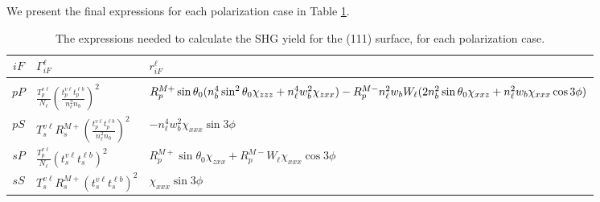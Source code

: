 \documentclass{article}
\begin{document}
We present the final expressions for each polarization case in Table
\ref{tab:summary}.

\begin{table}[b]
\centering
\begin{tabular}{ | c | p{80pt} | p{210pt} | }
\hline
$iF$ & $\Gamma^{\ell}_{iF}$ & $r^{\ell}_{iF}$ \\
\hline
&&\\
$pP$ &
$\frac{T^{v\ell}_{p}}{N_{\ell}}
\left(\frac{t^{v\ell}_{p}t^{\ell b}_{p}}{n^{2}_{\ell}n_{b}}\right)^{2}$ &
{\small
$R^{M+}_{p}\sin\theta_{0}
(n^{4}_{b}\sin^{2}\theta_{0}\chi_{zzz} + n^{4}_{\ell}w^{2}_{b}\chi_{zxx})
\newline- R^{M-}_{p}n^{2}_{\ell}w_{b}W_{\ell}
(2n^{2}_{b}\sin\theta_{0}\chi_{xxz} + n^{2}_{\ell}w_{b}\chi_{xxx}\cos3\phi)$
}
\\[3pt]
$pS$ &
$T_{s}^{v\ell}R^{M+}_{s}
\left(\frac{t^{v\ell}_{p}t^{\ell b}_{p}}{n^{2}_{\ell}n_{b}}\right)^{2}$ &
$-n^{4}_{\ell}w^{2}_{b}\chi_{xxx}\sin3\phi$
\\[15pt]
$sP$ &
$\frac{T^{v\ell}_{p}}{N_{\ell}}\left(t^{v\ell}_{s}t^{\ell b}_{s}\right)^{2}$ &
$R^{M+}_{p}\sin\theta_{0}\chi_{zxx} + R^{M-}_{p}W_{\ell}\chi_{xxx}\cos3\phi$
\\[15pt]
$sS$ & 
$T_{s}^{v\ell}R^{M+}_{s}\left(t^{v\ell}_{s}t^{\ell b}_{s}\right)^{2}$ &
$\chi_{xxx}\sin3\phi$
\\[15pt]
\hline
\end{tabular}
\caption{The expressions needed to calculate the SHG yield for the (111)
surface, for each polarization case.\label{tab:summary}}
\end{table}
\end{document}
